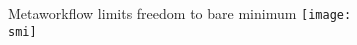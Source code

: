 \documentclass[10pt]{beamer}
\def\smi{out/ln/updir/mw-gcthesis-oral/library.bib}
\begin{document}
\begin{frame}{Metaworkflow limits freedom to bare minimum}
  \def\smi{out/ln/updir/mw-gcthesis-oral/ink/snakemake/venn_snakemake_metaworkflow.pdf}
  \texttt{[image: \\smi]}%
\end{frame}
\end{document}
